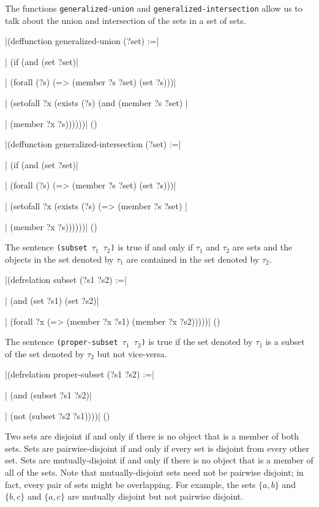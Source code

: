The functions {\tt generalized-union} and {\tt generalized-intersection} allow us to
talk about the union and intersection of the sets in a set of sets.

\medskip
\verbatim|(deffunction generalized-union (?set) :=|\par
\verbatim|  (if (and (set ?set)|\par
\verbatim|           (forall (?s) (=> (member ?s ?set) (set ?s)))|\par
\verbatim|      (setofall ?x (exists (?s) (and (member ?s ?set) |\par
\verbatim|                                     (member ?x ?s))))))|
\hfill(\equation)\par
\medskip

\medskip
\verbatim|(deffunction generalized-intersection (?set) :=|\par
\verbatim|  (if (and (set ?set)|\par
\verbatim|           (forall (?s) (=> (member ?s ?set) (set ?s)))|\par
\verbatim|      (setofall ?x (exists (?s) (=> (member ?s ?set) |\par
\verbatim|                                    (member ?x ?s))))))|
\hfill(\equation)\par
\medskip

The sentence {\tt (subset $\tau_1$ $\tau_2$)} is true if
and only if $\tau_1$ and $\tau_2$ are sets and the objects in the set
denoted by $\tau_1$ are contained in the set denoted by $\tau_2$.

\medskip
\verbatim|(defrelation subset (?s1 ?s2) :=|\par\nobreak
\verbatim|  (and (set ?s1) (set ?s2)|\par\nobreak
\verbatim|       (forall ?x (=> (member ?x ?s1) (member ?x ?s2)))))|
\hfill(\equation)\par
\medskip

The sentence {\tt (proper-subset $\tau_1$ $\tau_2$)} is true if
the set denoted by $\tau_1$ is a subset of the set denoted by $\tau_2$
but not vice-versa.

\medskip
\verbatim|(defrelation proper-subset (?s1 ?s2) :=|\par
\verbatim|  (and (subset ?s1 ?s2)|\par
\verbatim|       (not (subset ?s2 ?s1))))|
\hfill(\equation)\par
\medskip

Two sets are disjoint if and only if there is no object that is a
member of both sets.  Sets are pairwise-disjoint if and only if every
set is disjoint from every other set.  Sets are mutually-disjoint if and
only if there is no object that is a member of all of the sets. Note
that mutually-disjoint sets need not be pairwise disjoint; in fact, every
pair of sets might be overlapping.  For example, the sets $\{a,b\}$ and
$\{b,c\}$ and $\{a,c\}$ are mutually disjoint but not pairwise disjoint.

